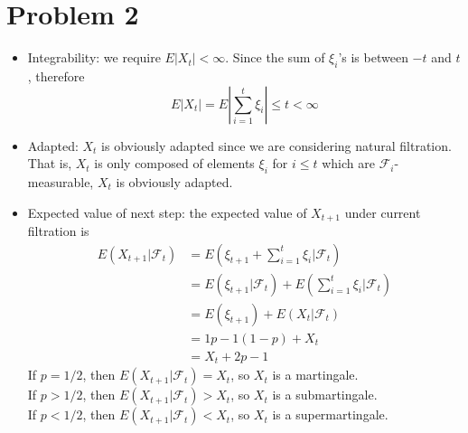 \documentclass{article}
\begin{document}
\section*{Problem 2}
	\begin{itemize}
		\item Integrability: we require $E|X_t| < \infty $. Since the sum of $\xi_i$'s is between $-t$ and $t$, therefore
		\begin{equation}
			E|X_t| = E\left|\sum_{i=1}^t \xi_i\right| \le t < \infty
		\end{equation}
		\item Adapted: $X_t$ is obviously adapted since we are considering natural filtration. That is, $X_t$ is only composed of elements $\xi_i$ for $i\le t$ which are $\mathcal{F}_i$-measurable, $X_t$ is obviously adapted.
		\item Expected value of next step: the expected value of $X_{t+1}$ under current filtration is
		\begin{align}
			E(X_{t+1}|\mathcal{F}_t) &= E(\xi_{t+1} + \sum_{i=1}^{t}\xi_{i}|\mathcal{F}_t) \\
			&= E(\xi_{t+1}|\mathcal{F}_t) + E(\sum_{i=1}^{t}\xi_{i}|\mathcal{F}_t) \\
			&= E(\xi_{t+1}) + E(X_t|\mathcal{F}_t) \\
			&= 1p - 1(1-p) + X_t \\
			&= X_t + 2p -1
		\end{align}
		If $p = 1 / 2$, then $E(X_{t+1}|\mathcal{F}_t) = X_t$, so $X_t$ is a martingale. \\
		If $p > 1 / 2$, then $E(X_{t+1}|\mathcal{F}_t) > X_t$, so $X_t$ is a submartingale. \\
		If $p < 1 / 2$, then $E(X_{t+1}|\mathcal{F}_t) < X_t$, so $X_t$ is a supermartingale.
	\end{itemize}
\end{document}
